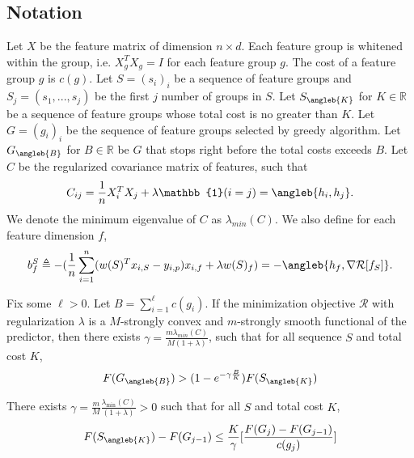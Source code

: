 \subsection{Notation}
Let $X$ be the feature matrix of dimension $n \times d$. 
Each feature group is whitened within the group, i.e. $X_g^TX_g = I$ for each feature group $g$. 
The cost of a feature group $g$ is $c(g)$. 
Let $S = (s_i)_i$ be a sequence of feature groups
and $S_j = (s_1, ..., s_j)$ be the first $j$ number of groups in $S$.  
Let $S_{\angleb{K}}$ for $K \in \mathbb{R}$ be a sequence of feature groups whose total cost is no greater than $K$. 
Let $G = (g_i)_i$ be the sequence of feature groups selected by greedy algorithm. 
Let $G_{\angleb{B}}$ for $B \in \mathbb{R}$ be $G$ that stops right before the total costs exceeds $B$. 
Let $C$ be the regularized covariance matrix of features, such that
  \begin{equation}
    C_{ij} = \frac{1}{n} X_i^TX_j + \lambda \mathbb{1}(i=j) = \angleb{h_i, h_j}.
  \end{equation}
We denote the minimum eigenvalue of $C$ as $\lambda_{min}(C)$. 
We also define for each feature dimension $f$, 
\begin{equation}
 b_{f}^S \triangleq - ( \frac{1}{n}\sum_{i=1}^n (w(S)^Tx_{i,S} - y_{i,p})x_{i,f} + \lambda w(S)_{f} ) = 
 	- \angleb{ h_f, \nabla \mathcal{R}[f_S] }. 
\end{equation}

\begin{theorem}
Fix some $\ell > 0$. Let $B = \sum _{i=1}^\ell c(g_i)$. 
If the minimization objective $\mathcal{R}$ 
 with regularization $\lambda$
is a $M$-strongly convex and $m$-strongly smooth
 functional of the predictor, then there exists 
  $\gamma = \frac{m\lambda _{min}(C)}{M(1+\lambda)}$, such that
for all sequence $S$ and total cost $K$, 
\begin{align}
  F(G_{\angleb{B}}) > (1 - e^{-\gamma\frac{B}{K}})F(S_{\angleb{K}})
\end{align}
\label{thm:main}
\end{theorem}

\begin{lemma}
  There exists $\gamma = \frac{m}{M}\frac{\lambda_{\min}(C)}{(1 +\lambda)} > 0$ such that for all $S$ and total cost $K$,  
  \begin{align}
    F(S_{\angleb{K}}) - F(G_{j-1}) \leq \frac{K}{\gamma}
      \lbrack \frac{F(G_j) - F(G_{j-1})}{c(g_j)} \rbrack
  \end{align}
  \label{lemma:main}
\end{lemma}


